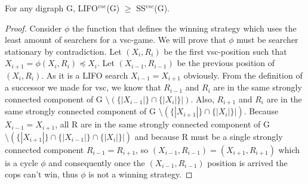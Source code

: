 \begin{lemma}
For any digraph G, LIFO$^{vsc}$(G) $\geq$ SS$^{vsc}$(G).
\end{lemma}
\begin{proof}
Consider $\phi$ the function that defines the winning strategy which uses the least amount of searchers for a vsc-game. We will prove that $\phi$ must be searcher stationary by contradiction. 
Let $(X_i, R_i)$ be the first vsc-position such that $X_{i+1} = \phi (X_i, R_i) \preceq X_i$. Let $(X_{i-1}, R_{i-1})$ be the previous position of $(X_i, R_i)$. As it is a LIFO search  $X_{i-1} = X_{i+1}$ obviously. From the definition of a successor we made for vsc, we know that  $R_{i-1}$ and $R_i$ are in the same strongly connected component of G $\setminus (\{|X_{i-1}|\} \cap \{|X_i|\}|)$. Also, $R_{i+1}$ and $R_i$ are in the same strongly connected component of G $\setminus (\{|X_{i+1}|\} \cap \{|X_i|\}|)$. Because $X_{i-1} = X_{i+1}$, all R are in the same strongly connected component of G $\setminus (\{|X_{i+1}|\} \cap \{|X_{i-1}|\} \cap \{|X_i|\}|)$ and because R must be a single strongly connected component $R_{i-1} = R_{i+1}$, so $(X_{i-1}, R_{i-1}) = (X_{i+1}, R_{i+1})$ which is a cycle $\phi$ and consequently once the $(X_{i-1}, R_{i-1})$ position is arrived the cops can't win, thus $\phi$ is not a winning strategy.
\end{proof}